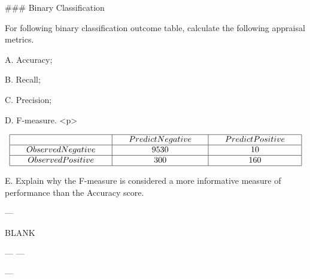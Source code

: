 ### Binary Classification 

For following binary classification outcome table, calculate the following appraisal metrics.

A.	Accuracy;

B.	Recall;

C.	Precision;

D.	F-measure.
<p>	


$$\begin{array}{|c|c|c|}
\hline  & \phantom{spa}Predict Negative\phantom{spa} & \phantom{spa}Predict Positive\phantom{spa} \\ 
\hline\phantom{spa} Observed Negative \phantom{spa}&	9530	&	10	\\ 
\hline \phantom{spa}Observed Positive\phantom{spa} & 	300	&	160	\\ 
\hline 
\end{array}$$

E. Explain why the F-measure is considered a more informative measure of performance than the Accuracy score.

---

BLANK

---
---

---